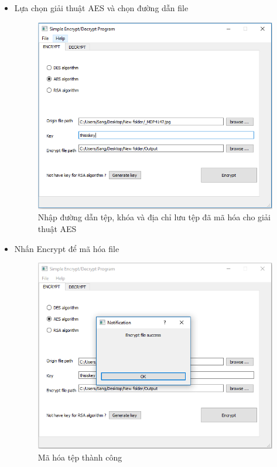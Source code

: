 \documentclass[a4paper]{article}
\begin{document}
\begin{itemize}
	\item
	Lựa chọn giải thuật AES và chọn đường dẫn file
\begin{center}
    \begin{figure}[H]
    \begin{center}
     \includegraphics[scale=.5]{hinh/aes-2}
    \end{center}
    \caption{Nhập đường dẫn tệp, khóa và địa chỉ lưu tệp đã mã hóa cho giải thuật AES}
    \label{refhinh2}
    \end{figure}
\end{center}
	\item
Nhấn Encrypt để mã hóa file
\begin{center}
    \begin{figure}[H]
    \begin{center}
     \includegraphics[scale=.5]{hinh/aes-3}
    \end{center}
    \caption{Mã hóa tệp thành công}
    \label{refhinh3}
    \end{figure}
\end{center}
	\end{itemize}
\end{document}
